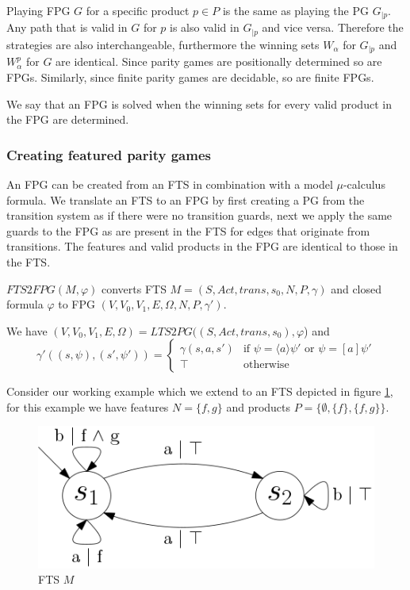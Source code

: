 Playing FPG $G$ for a specific product $p\in P$ is the same as playing the PG $G_{|p}$. Any path that is valid in $G$ for $p$ is also valid in $G_{|p}$ and vice versa. Therefore the strategies are also interchangeable, furthermore the winning sets $W_\alpha$ for $G_{|p}$ and $W_\alpha^p$ for $G$ are identical. Since parity games are positionally determined so are FPGs. Similarly, since finite parity games are decidable, so are finite FPGs.

We say that an FPG is solved when the winning sets for every valid product in the FPG are determined.
\subsubsection{Creating featured parity games}
An FPG can be created from an FTS in combination with a model $\mu$-calculus formula. We translate an FTS to an FPG by first creating a PG from the transition system as if there were no transition guards, next we apply the same guards to the FPG as are present in the FTS for edges that originate from transitions. The features and valid products in the FPG are identical to those in the FTS.
\begin{definition}
	\label{def_FTS2FPG}
	$FTS2FPG(M, \varphi)$ converts FTS $M = (S, Act, trans, s_0, N, P, \gamma)$ and closed formula $\varphi$ to FPG $(V, V_0, V_1, E, \Omega, N, P, \gamma')$.
	
	We have $(V, V_0, V_1, E, \Omega) = \textit{LTS2PG}((S, Act, trans, s_0), \varphi$) and
	\[ \gamma'((s, \psi),(s', \psi')) = \begin{cases}
	\gamma(s,a,s') & \text{if }\psi = \langle a \rangle \psi'\text{ or }\psi = [a]\psi' \\
	\top & \text{otherwise}
	\end{cases}\]
\end{definition}
Consider our working example which we extend to an FTS depicted in figure \ref{fig:exverfts}, for this example we have features $N = \{f, g\}$ and products $P = \{\emptyset, \{f\},\{f,g\}\}$.
\begin{figure}[h]
	\centering
	\includegraphics[scale=0.3]{Examples/ExamleVerification/FTS}
	\caption[FTS $M$]{FTS $M$}
	\label{fig:exverfts}
\end{figure}
